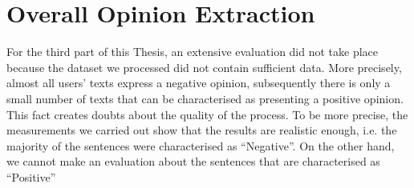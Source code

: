 \section{Overall Opinion Extraction}\label{43_ref}
For the third part of this Thesis, an extensive evaluation did not take place because the dataset we processed did not contain sufficient data. More precisely, almost all users' texts express a negative opinion, subsequently there is only a small number of texts that can be characterised as presenting a positive opinion. This fact creates doubts about the quality of the process. To be more precise, the measurements we carried out show that the results are realistic enough, i.e. the majority of the sentences were characterised as ``Negative''. On the other hand, we cannot make an evaluation about the sentences that are characterised as ``Positive''

